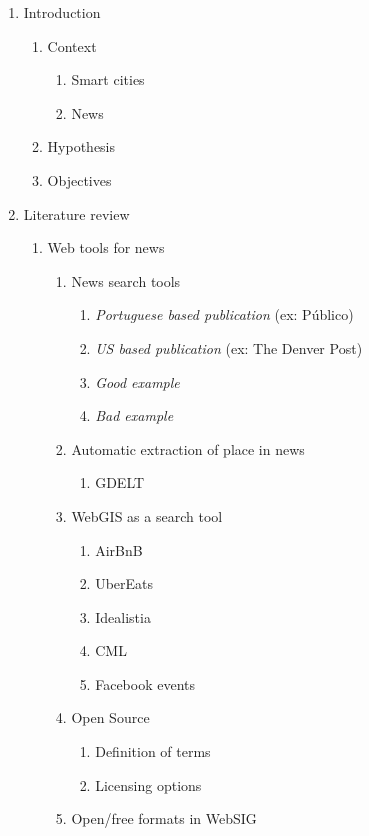 \begin{enumerate}
	\item Introduction
	\begin{enumerate}
		\item Context
		\begin{enumerate}
			\item Smart cities \cite{Oliveira2021, Roche2012}
			\item News
		\end{enumerate}
		\item Hypothesis
		\item Objectives
	\end{enumerate}
	\item Literature review
	\begin{enumerate}
		\item Web tools for news
		\begin{enumerate}
			\item News search tools
			\begin{enumerate}
				\item \textit{Portuguese based publication} (ex: Público) \cite{Publico2020}
				\item \textit{US based publication} (ex: The Denver Post) \cite{TDP2020}
				\item \textit{Good example}
				\item \textit{Bad example}
			\end{enumerate}
			\item Automatic extraction of place in news
			\begin{enumerate}
				\item GDELT
			\end{enumerate}
			\item WebGIS as a search tool
			\begin{enumerate}
				\item AirBnB
				\item UberEats
				\item Idealistia
				\item CML
				\item Facebook events
			\end{enumerate}
			\item Open Source
			\begin{enumerate}
				\item Definition of terms
				\item Licensing options
			\end{enumerate}
			\item Open/free formats in WebSIG

\end{enumerate}
\end{enumerate}
\end{enumerate}
